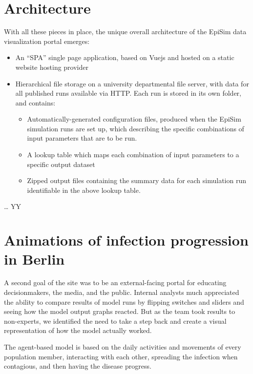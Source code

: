 \hypertarget{architecture}{%
\section{Architecture}\label{architecture}}

With all these pieces in place, the unique overall architecture of the
EpiSim data visualization portal emerges:

\begin{itemize}
\item
  An ``SPA'' single page application, based on Vuejs and hosted on a
  static website hosting provider
\item
  Hierarchical file storage on a university departmental file server,
  with data for all published runs available via HTTP. Each run is
  stored in its own folder, and contains:

  \begin{itemize}
  \item
    Automatically-generated configuration files, produced when the
    EpiSim simulation runs are set up, which describing the specific
    combinations of input parameters that are to be run.
  \item
    A lookup table which maps each combination of input parameters to a
    specific output dataset
  \item
    Zipped output files containing the summary data for each simulation
    run identifiable in the above lookup table.
  \end{itemize}
\end{itemize}

\ldots{} YY

\hypertarget{animations-of-infection-progression-in-berlin}{%
\section{Animations of infection progression in
Berlin}\label{animations-of-infection-progression-in-berlin}}

A second goal of the site was to be an external-facing portal for
educating decisionmakers, the media, and the public. Internal analysts
much appreciated the ability to compare results of model runs by
flipping switches and sliders and seeing how the model output graphs
reacted. But as the team took results to non-experts, we identified the
need to take a step back and create a visual representation of how the
model actually worked.

The agent-based model is based on the daily activities and movements of
every population member, interacting with each other, spreading the
infection when contagious, and then having the disease progress.

